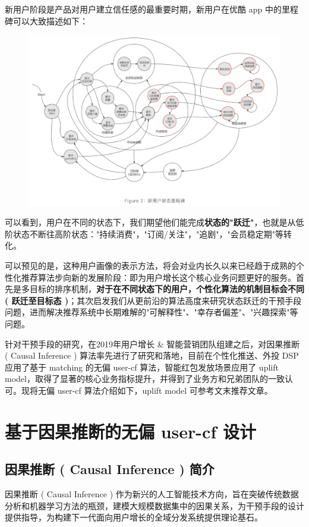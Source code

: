 \documentclass[12pt]{article}
\begin{document}
新用户阶段是产品对用户建立信任感的最重要时期，新用户在优酷 app 中的里程碑可以大致描述如下：
\begin{figure}[H]
    \centering
    \includegraphics[width=1\textwidth]{fig/NewMemberStatusMilestones.png}
\end{figure}

可以看到，用户在不同的状态下，我们期望他们能完成\textbf{状态的"跃迁"}，也就是从低阶状态不断往高阶状态："持续消费"，"订阅/关注"，"追剧"，"会员稳定期"等转化。

可以预见的是，这种用户画像的表示方法，将会对业内长久以来已经趋于成熟的个性化推荐算法步向新的发展阶段：即为用户增长这个核心业务问题更好的服务。首先是多目标的排序机制，\textbf{对于在不同状态下的用户，个性化算法的机制目标会不同 ( 跃迁至目标态 )}；其次启发我们从更前沿的算法高度来研究状态跃迁的干预手段问题，进而解决推荐系统中长期难解的"可解释性"、"幸存者偏差"、"兴趣探索"等问题。

针对干预手段的研究，在2019年用户增长 \& 智能营销团队组建之后，对因果推断 ( Causal Inference ) 算法率先进行了研究和落地，目前在个性化推送、外投 DSP 应用了基于 matching 的无偏 user-cf 算法，智能红包发放场景应用了 uplift model，取得了显著的核心业务指标提升，并得到了业务方和兄弟团队的一致认可。现将无偏 user-cf 算法介绍如下，uplift model 可参考文末推荐文章。

\section{基于因果推断的无偏 user-cf 设计}
\subsection{因果推断 ( Causal Inference ) 简介}
因果推断 ( Causal Inference ) 作为新兴的人工智能技术方向，旨在突破传统数据分析和机器学习方法的瓶颈，建模大规模数据集中的因果关系，为干预手段的设计提供指导，为构建下一代面向用户增长的全域分发系统提供理论基石。
\end{document}
